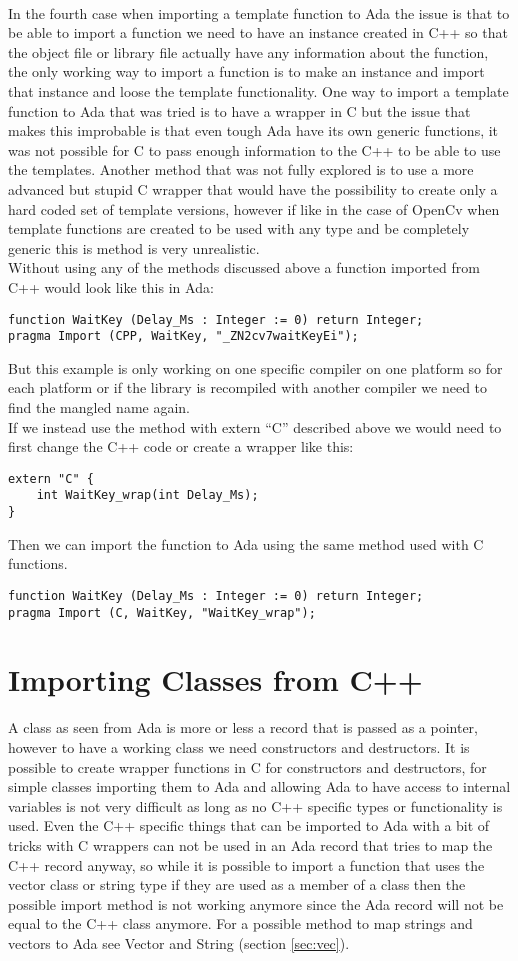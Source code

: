 \\
In the fourth case when importing a template function to Ada the issue is that to be able to import a function we need to have an instance created in C++ so that the object file or library file actually have any information about the function, the only working way to import a function is to make an instance and import that instance and loose the template functionality. One way to import a template function to Ada that was tried is to have a wrapper in C but the issue that makes this improbable is that even tough Ada have its own generic functions, it was not possible for C to pass enough information to the C++ to be able to use the templates. Another method that was not fully explored is to use a more advanced but stupid C wrapper that would have the possibility to create only a hard coded set of template versions, however if like in the case of OpenCv when template functions are created to be used with any type and be completely generic this is method is very unrealistic. 
\\
Without using any of the methods discussed above a function imported from C++ would look like this in Ada:
\begin{lstlisting}
function WaitKey (Delay_Ms : Integer := 0) return Integer;
pragma Import (CPP, WaitKey, "_ZN2cv7waitKeyEi");
\end{lstlisting}
But this example is only working on one specific compiler on one platform so for each platform or if the library is recompiled with another compiler we need to find the mangled name again.
\\
If we instead use the method with extern “C” described above we would need to first change the C++ code or create a wrapper like this:
\begin{lstlisting}
extern "C" {
	int WaitKey_wrap(int Delay_Ms);
}
\end{lstlisting}
Then we can import the function to Ada using the same method used with C functions.
\begin{lstlisting}
function WaitKey (Delay_Ms : Integer := 0) return Integer;
pragma Import (C, WaitKey, "WaitKey_wrap");
\end{lstlisting}
\section{Importing Classes from C++}
A class as seen from Ada is more or less a record that is passed as a pointer, however to have a working class we need constructors and destructors. It is possible to create wrapper functions in C for constructors and destructors, for simple classes importing them to Ada and allowing Ada to have access to internal variables is not very difficult as long as no C++ specific types or functionality is used. Even the C++ specific things that can be imported to Ada with a bit of tricks with C wrappers can not be used in an Ada record that tries to map the C++ record anyway, so while it is possible to import a function that uses the vector class or string type if they are used as a member of a class then the possible import method is not working anymore since the Ada record will not be equal to the C++ class anymore. For a possible method to map strings and vectors to Ada see Vector and String (section \ref{sec:vec}).
